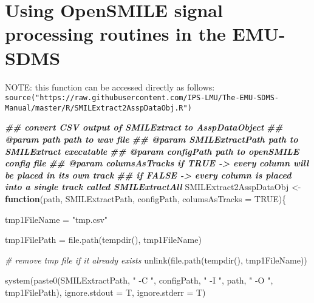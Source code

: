 \documentclass[
]{book}
\newenvironment{Shaded}{\begin{snugshade}}{\end{snugshade}}
\newcommand{\AttributeTok}[1]{\textcolor[rgb]{0.77,0.63,0.00}{#1}}
\newcommand{\CommentTok}[1]{\textcolor[rgb]{0.56,0.35,0.01}{\textit{#1}}}
\newcommand{\ConstantTok}[1]{\textcolor[rgb]{0.00,0.00,0.00}{#1}}
\newcommand{\ControlFlowTok}[1]{\textcolor[rgb]{0.13,0.29,0.53}{\textbf{#1}}}
\newcommand{\DocumentationTok}[1]{\textcolor[rgb]{0.56,0.35,0.01}{\textbf{\textit{#1}}}}
\newcommand{\FunctionTok}[1]{\textcolor[rgb]{0.00,0.00,0.00}{#1}}
\newcommand{\NormalTok}[1]{#1}
\newcommand{\OtherTok}[1]{\textcolor[rgb]{0.56,0.35,0.01}{#1}}
\newcommand{\StringTok}[1]{\textcolor[rgb]{0.31,0.60,0.02}{#1}}
\begin{document}
\hypertarget{sec:app-chap-wrassp-opensmileSigProc}{%
\section{Using OpenSMILE signal processing routines in the EMU-SDMS}\label{sec:app-chap-wrassp-opensmileSigProc}}

NOTE: this function can be accessed directly as follows: \texttt{source("https://raw.githubusercontent.com/IPS-LMU/The-EMU-SDMS-Manual/master/R/SMILExtract2AsspDataObj.R")}

\begin{Shaded}
\begin{Highlighting}[]
\DocumentationTok{\#\#\textquotesingle{} convert CSV output of SMILExtract to AsspDataObject}
\DocumentationTok{\#\#\textquotesingle{} @param path path to wav file}
\DocumentationTok{\#\#\textquotesingle{} @param SMILExtractPath path to SMILExtract executable}
\DocumentationTok{\#\#\textquotesingle{} @param configPath path to openSMILE config file}
\DocumentationTok{\#\#\textquotesingle{} @param columsAsTracks if TRUE {-}\textgreater{} every column will be placed in it\textquotesingle{}s own track}
\DocumentationTok{\#\#\textquotesingle{} if FALSE {-}\textgreater{} every column is placed into a single track called SMILExtractAll}
\NormalTok{SMILExtract2AsspDataObj }\OtherTok{\textless{}{-}} \ControlFlowTok{function}\NormalTok{(path,}
\NormalTok{                                    SMILExtractPath,}
\NormalTok{                                    configPath,}
                                    \AttributeTok{columsAsTracks =} \ConstantTok{TRUE}\NormalTok{)\{}

\NormalTok{  tmp1FileName }\OtherTok{=} \StringTok{"tmp.csv"}

\NormalTok{  tmp1FilePath }\OtherTok{=} \FunctionTok{file.path}\NormalTok{(}\FunctionTok{tempdir}\NormalTok{(), tmp1FileName)}

  \CommentTok{\# remove tmp file if it already exists}
  \FunctionTok{unlink}\NormalTok{(}\FunctionTok{file.path}\NormalTok{(}\FunctionTok{tempdir}\NormalTok{(), tmp1FileName))}

  \FunctionTok{system}\NormalTok{(}\FunctionTok{paste0}\NormalTok{(SMILExtractPath,}
                \StringTok{" {-}C "}\NormalTok{, configPath,}
                \StringTok{" {-}I "}\NormalTok{, path,}
                \StringTok{" {-}O "}\NormalTok{, tmp1FilePath),}
         \AttributeTok{ignore.stdout =}\NormalTok{ T,}
         \AttributeTok{ignore.stderr =}\NormalTok{ T)}


\end{Highlighting}
\end{Shaded}
\end{document}
